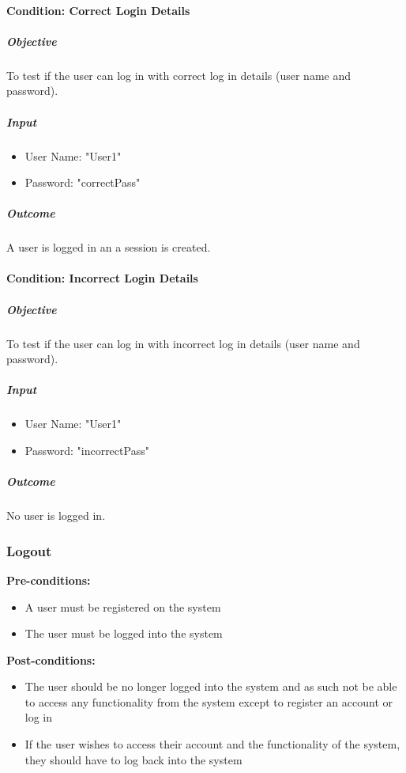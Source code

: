 \documentclass{article}
\begin{document}
			\paragraph{Condition: Correct Login Details}
				\subparagraph{Objective}
					To test if the user can log in with correct log in details (user name and password).
					
				\subparagraph{Input}
					\begin{itemize}
						\item User Name: "User1"
						\item Password: "correctPass"
					\end{itemize}
			
				\subparagraph{Outcome}
					A user is logged in an a session is created.
			
			\paragraph{Condition: Incorrect Login Details}
				\subparagraph{Objective}
					To test if the user can log in with incorrect log in details (user name and password).
				
				\subparagraph{Input}
					\begin{itemize}
						\item User Name: "User1"
						\item Password: "incorrectPass"
					\end{itemize}
				
				\subparagraph{Outcome}
					No user is logged in.
					
		\subsubsection{Logout}		
			\textbf{Pre-conditions:}
				\begin{itemize}
					\item A user must be registered on the system
					\item The user must be logged into the system
				\end{itemize}
			\textbf{Post-conditions:}
				\begin{itemize}
					\item The user should be no longer logged into the system and as such not be able to access any functionality from the system except to register an account or log in
					\item If the user wishes to access their account and the functionality of the system, they should have to log back into the system
				\end{itemize}
			
\end{document}
